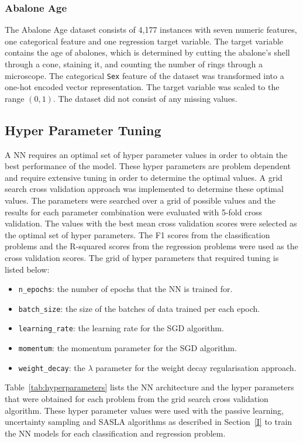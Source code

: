 \documentclass[conference]{IEEEtran}
\begin{document}
	\subsubsection{Abalone Age}
	The Abalone Age dataset consists of 4,177 instances with seven numeric features, one categorical feature and one regression target variable. The target variable contains the age of abalones, which is determined by cutting the abalone's shell through a cone, staining it, and counting the number of rings through a microscope. The categorical \texttt{Sex} feature of the dataset was transformed into a one-hot encoded vector representation. The target variable was scaled to the range $(0, 1)$. The dataset did not consist of any missing values.
	
	\subsection{Hyper Parameter Tuning}
	A NN requires an optimal set of hyper parameter values in order to obtain the best performance of the model. These hyper parameters are problem dependent and require extensive tuning in order to determine the optimal values. A grid search cross validation approach was implemented to determine these optimal values. The parameters were searched over a grid of possible values and the results for each parameter combination were evaluated with 5-fold cross validation. The values with the best mean cross validation scores were selected as the optimal set of hyper parameters. The F1 scores from the classification problems and the R-squared scores from the regression problems were used as the cross validation scores. The grid of hyper parameters that required tuning is listed below:
	\begin{itemize}
		\item \texttt{n\_epochs}: the number of epochs that the NN is trained for.
		\item \texttt{batch\_size}: the size of the batches of data trained per each epoch.
		\item \texttt{learning\_rate}: the learning rate for the SGD algorithm.
		\item \texttt{momentum}: the momentum parameter for the SGD algorithm.
		\item \texttt{weight\_decay}: the $\lambda$ parameter for the weight decay regularisation approach.
	\end{itemize}
	Table~\ref{tab:hyperparameters} lists the NN architecture and the hyper parameters that were obtained for each problem from the grid search cross validation algorithm. These hyper parameter values were used with the passive learning, uncertainty sampling and SASLA algorithms as described in Section~\ref{I} to train the NN models for each classification and regression problem.
\end{document}
